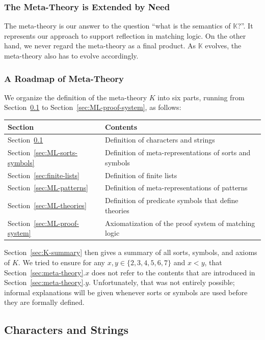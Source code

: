 \documentclass[UTF8,11pt]{article}
\theoremstyle{plain}
\theoremstyle{definition}
\theoremstyle{remark}
\newcommand{\K}{\mbox{$\mathbb{K}$}\xspace}
\begin{document}
\subsubsection{The Meta-Theory is Extended by Need}
The meta-theory is our answer to the question ``what is the semantics of \K?''.
It represents our approach to support reflection in matching logic.
On the other hand, we never regard the meta-theory as a final product. 
As \K evolves, the meta-theory also has to evolve accordingly.


\subsubsection{A Roadmap of Meta-Theory}
We organize the definition of the meta-theory $K$ into six
parts, running from Section~\ref{sec:chars-string} to
Section~\ref{sec:ML-proof-system}, as follows:
\begin{center}
\begin{tabular}{l|l}
	\textbf{Section} & \textbf{Contents}
	\\\hline\hline
	Section~\ref{sec:chars-string} & Definition of characters and strings
	\\\hline
	Section~\ref{sec:ML-sorts-symbols} & Definition of meta-representations 
	of sorts and symbols
	\\\hline
	Section~\ref{sec:finite-lists} & Definition of finite lists
	\\\hline
	Section~\ref{sec:ML-patterns} & Definition of meta-representations of 
	patterns
	\\\hline
	Section~\ref{sec:ML-theories} & Definition of predicate symbols that
	define theories
	\\\hline
	Section~\ref{sec:ML-proof-system} & Axiomatization of the proof system of 
	matching logic
	\\\hline
\end{tabular}
\end{center}
Section~\ref{sec:K-summary} then gives a summary of all sorts, symbols, and
axioms of $K$.
We tried to ensure for any $x, y \in \{2,3,4,5,6,7\}$ and $x < y$, that 
Section~\ref{sec:meta-theory}.$x$ does not refer to the contents that are 
introduced in Section~\ref{sec:meta-theory}.$y$.
Unfortunately, that was not entirely possible;
informal explanations will be given whenever sorts or symbols are used before
they are formally defined.

\subsection{Characters and Strings}
\label{sec:chars-string}
\end{document}
